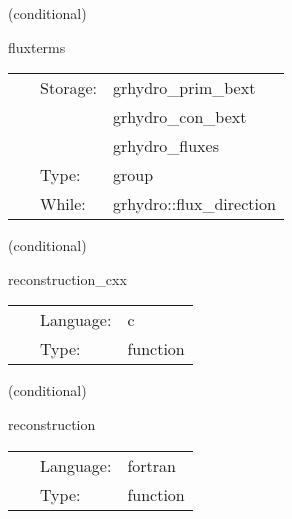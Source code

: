 \documentclass{article}
\begin{document}
\vspace{5mm}

   (conditional) 

\hspace{5mm} fluxterms 

\hspace{5mm}{\it calculation of intercell fluxes } 


\hspace{5mm}

 \begin{tabular*}{160mm}{cll} 
~ & Storage:  & grhydro\_prim\_bext \\ 
~& ~ &grhydro\_con\_bext\\ 
~& ~ &grhydro\_fluxes\\ 
~ & Type:  & group \\ 
~ & While:  & grhydro::flux\_direction \\ 
\end{tabular*} 


\vspace{5mm}

   (conditional) 

\hspace{5mm} reconstruction\_cxx 

\hspace{5mm}{\it reconstruct the functions at the cell boundaries } 


\hspace{5mm}

 \begin{tabular*}{160mm}{cll} 
~ & Language:  & c \\ 
~ & Type:  & function \\ 
\end{tabular*} 


\vspace{5mm}

   (conditional) 

\hspace{5mm} reconstruction 

\hspace{5mm}{\it reconstruct the functions at the cell boundaries } 


\hspace{5mm}

 \begin{tabular*}{160mm}{cll} 
~ & Language:  & fortran \\ 
~ & Type:  & function \\ 
\end{tabular*} 
\end{document}
